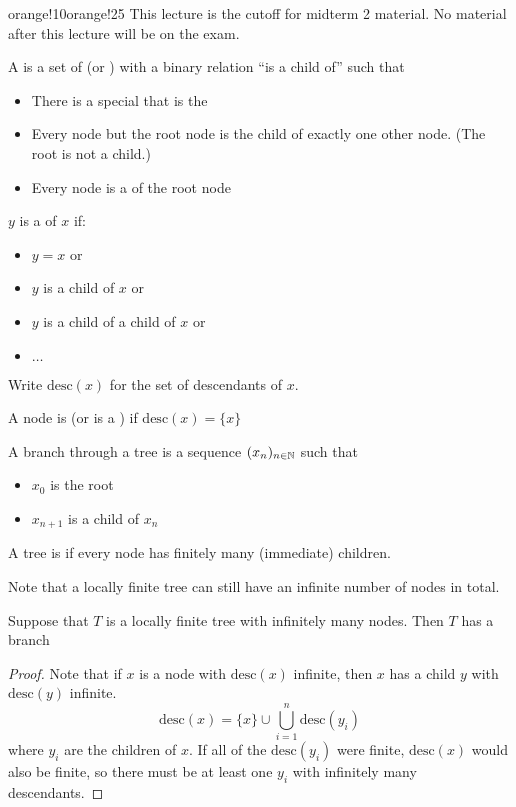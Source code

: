 \documentclass[notes.tex]{subfiles}
\begin{document}
\begin{classnote}{orange!10}{orange!25}
This lecture is the cutoff for midterm 2 material. No material after this lecture will be on the exam.
\end{classnote}
\begin{digression}
	A  is a set of  (or ) with a binary relation ``is a child of'' such that
	\begin{itemize}
		\item There is a special  that is the 
		\item Every node but the root node is the child of exactly one other node. (The root is not a child.)
		\item Every node is a  of the root node
	\end{itemize}

	\begin{defn}
		$y$ is a  of $x$ if:
		\begin{itemize}
			\item $y=x$ or
			\item $y$ is a child of $x$ or
			\item $y$ is a child of a child of $x$ or
			\item $\ldots$
		\end{itemize}
		Write $\mathrm{desc}(x)$ for the set of descendants of $x$.
		\begin{defn}
			A node is  (or is a ) if $\mathrm{desc}(x) =\{x\}$
		\end{defn}
		\begin{defn}
			A branch through a tree is a sequence $(x_n)_{n\in\mathbb{N}}$ such that 
			\begin{itemize}
				\item $x_0$ is the root
				\item $x_{n+1}$ is a child of $x_n$
			\end{itemize}
		\end{defn}
	\end{defn}
	\begin{defn}
		A tree is  if every node has finitely many (immediate) children.
	\end{defn}
	Note that a locally finite tree can still have an infinite number of nodes in total.
	\begin{lemma}[K\"onig]
		\label{Konig}
		Suppose that $T$ is a locally finite tree with infinitely many nodes. Then $T$ has a branch
	\end{lemma}
	\begin{proof}
		Note that if $x$ is a node with $\mathrm{desc}(x)$ infinite, then $x$ has a child $y$ with $\mathrm{desc}(y)$ infinite.
		\[
			\mathrm{desc}(x) = \{x\}\cup \bigcup_{i=1}^n\mathrm{desc}(y_i)
		\]
		where $y_i$ are the children of $x$. If all of the $\mathrm{desc}(y_i)$ were finite, $\mathrm{desc}(x)$ would also be finite, so there must be at least one $y_i$ with infinitely many descendants.


\end{proof}
\end{digression}
\end{document}
